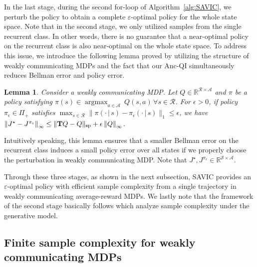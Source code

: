 \documentclass{article}
\newtheorem{lemma}[theorem]{Lemma}
\theoremstyle{definition}
\theoremstyle{remark}
\DeclareMathOperator*{\argmax}{argmax}
\newcommand{\real}{\mathbb{R}}
\newcommand{\cA}{\mathcal{A}}
\newcommand{\cS}{\mathcal{S}}
\newcommand{\cR}{\mathcal{R}}
\newcommand{\T}{\mathbf{T}}
\newcommand*{\infn}[1]{\left\|{#1}\right\|_{\infty}}
\renewcommand{\sp}[1]{\|{#1}\|_\text{\rm sp}}
\begin{document}
In the last stage,  during the second for-loop of Algorithm~\ref{alg:SAVIC}, we perturb the policy to obtain a complete $\varepsilon$-optimal policy for the whole state space. Note that in the second stage, we only utilized samples from the single recurrent class. In other words, there is no guarantee that a near-optimal policy on the recurrent class is also near-optimal on the whole state space. To address this issue,   we introduce the following lemma proved by utilizing the structure of weakly communicating MDPs and the fact that our Anc-QI simultaneously reduces Bellman error and policy error.  
\begin{lemma}\label{lem:pur}
Consider a weakly communicating MDP. Let $Q\in\real^{\cR\times\cA}$ and $\pi$ be a policy satisfying $\pi(s)\in\argmax_{a\in\cA}~Q(s,a) \, \forall s \in \cR$.
For $\epsilon>0$, if policy $\pi_\epsilon \in \Pi_+$ satisfies $\max_{s \in \cR}\|\pi(\cdot \,|\, s)-\pi_\epsilon (\cdot \,|\, s)\|_1\le \epsilon$, we have
$    \infn{J^\star-J^{\pi_\epsilon}} 
    \le \sp{\T Q -Q}
    +\epsilon  \infn{Q}.$
\end{lemma}
Intuitively speaking, this lemma ensures that a smaller Bellman error on the recurrent class induces a small policy error over all states if we properly choose the perturbation in weakly communicating MDP. Note that $J^\star, J^{\pi_\epsilon} \in \real^{\cS \times \cA}$.

Through these three stages, as shown in the next subsection, SAVIC provides an $\varepsilon$-optimal policy with efficient sample complexity from a single trajectory in weakly communicating average-reward MDPs. 
We lastly note that the framework of the second stage basically follows \cite{lee2025near} which analyze sample complexity under the generative model.

\subsection{Finite sample complexity for weakly communicating MDPs}
\end{document}
